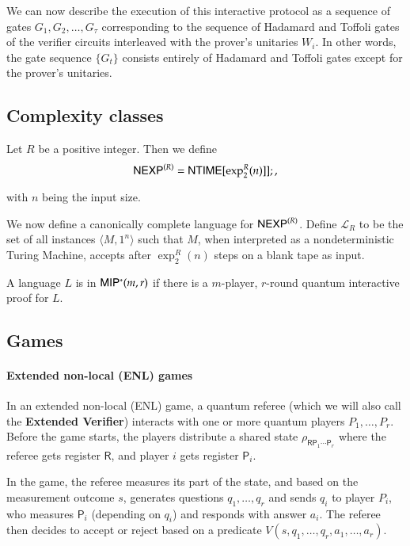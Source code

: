 \documentclass[11pt,letterpaper]{article}
\newcommand{\sP}{{\mathsf{P}}}
\newcommand{\sR}{{\mathsf{R}}}
\newcommand{\NEXPR}{{\sf NEXP}^{(R)}}
\newcommand{\NTIME}{{\sf NTIME}}
\newcommand{\MIPstar}{{\sf MIP^*}}
\begin{document}
We can now describe the execution of this interactive protocol as a sequence of gates $G_1,G_2,\ldots,G_\tau$ corresponding to the sequence of Hadamard and Toffoli gates of the verifier circuits interleaved with the prover's unitaries $W_i$. In other words, the gate sequence $\{G_t\}$ consists entirely of Hadamard and Toffoli gates except for the prover's unitaries. %

\subsection{Complexity classes}

\begin{definition}
	Let $R$ be a positive integer. Then we define
	\[
		\NEXPR = \NTIME[\exp^R_2(n)]];,
	\]
\end{definition}
with $n$ being the input size. 

We now define a canonically complete language for $\NEXPR$. Define $\mathcal{L}_R$ to be the set of all instances $\langle M, 1^n \rangle$ such that $M$, when interpreted as a nondeterministic Turing Machine, accepts after $\exp^R_2(n)$ steps on a blank tape as input.

\begin{definition}[$\MIPstar$]
	A language $L$ is in $\MIPstar(m,r)$ if there is a $m$-player, $r$-round quantum interactive proof for $L$.
\end{definition}





\subsection{Games}

\paragraph{Extended non-local (ENL) games} In an extended non-local (ENL) game, a quantum referee (which we will also call the \textbf{Extended Verifier}) interacts with one or more quantum players $P_1,\ldots,P_r$. Before the game starts, the players distribute a shared state $\rho_{\sR \sP_1 \cdots \sP_r}$ where the referee gets register $\sR$, and player $i$ gets register $\sP_i$. 

In the game, the referee measures its part of the state, and based on the measurement outcome $s$, generates questions $q_1,\ldots,q_r$ and sends $q_i$ to player $P_i$, who measures $\sP_i$ (depending on $q_i$) and  responds with answer $a_i$. The referee then decides to accept or reject based on a predicate $V(s,q_1,\ldots,q_r,a_1,\ldots,a_r)$.
\end{document}
